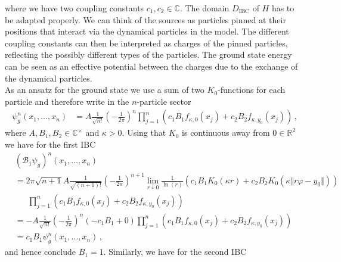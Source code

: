 where we have two coupling constants $c_{1},c_{2} \in \mathbb{C}$. The domain $D_{\textrm{IBC}}$ of $H$ has to be adapted properly. We can think of the sources as particles pinned at their positions that interact via the dynamical particles in the model. The different coupling constants can then be interpreted as charges of the pinned particles, reflecting the possibly different types of the particles. The ground state energy can be seen as an effective potential between the charges due to the exchange of the dynamical particles.
\\
As an ansatz for the ground state we use a sum of two $K_{0}$-functions for each particle and therefore write in the $n$-particle sector
\begin{align*}
  \psi_{g}^{n}
  \left(
    x_{1}
    ,
    \dots
    ,
    x_{n}
  \right)
  &=
  A
  \frac{1}{\sqrt{n!}}
  \left(
    -
    \frac{1}{2\pi}
  \right)^{n}
  \prod_{j = 1}^{n}
  \left(
    c_{1}
    B_{1}
    f_{\kappa,0}(x_{j})
    +
    c_{2}
    B_{2}
    f_{\kappa,y_{0}}(x_{j})
  \right)
  \,,
\end{align*}
where $A,B_{1},B_{2} \in \mathbb{C}^{\times}$ and $\kappa > 0$. Using that $K_{0}$ is continuous away from $0 \in \mathbb{R}^{2}$ we have for the first IBC
\begin{align*}
  &
  (\mathcal{B}_{1}\psi_{g})^{n}
  \left(
    x_{1}
    ,
    \dots
    ,
    x_{n}
  \right)
  \\
  &=
  2\pi
  \sqrt{n + 1}
  A
  \frac{1}{\sqrt{(n + 1)!}}
  \left(
    -
    \frac{1}{2\pi}
  \right)^{n + 1}
  \lim_{r \downarrow 0}
  \frac{1}{\ln(r)}
  \left(
    c_{1}
    B_{1}
    K_{0}(\kappa r)
    +
    c_{2}
    B_{2}
    K_{0}
    \left(
      \kappa
      \Vert r\varphi - y_{0} \Vert
    \right)
  \right)
  \\
  &\phantom{=\ }
  \prod_{j = 1}^{n}
  \left(
    c_{1}
    B_{1}
    f_{\kappa,0}(x_{j})
    +
    c_{2}
    B_{2}
    f_{\kappa,y_{0}}(x_{j})
  \right)
  \\
  &=
  -
  A
  \frac{1}{\sqrt{n!}}
  \left(
    -
    \frac{1}{2\pi}
  \right)^{n}
  \left(
    -
    c_{1}
    B_{1}
    +
    0
  \right)
  \prod_{j = 1}^{n}
  \left(
    c_{1}
    B_{1}
    f_{\kappa,0}(x_{j})
    +
    c_{2}
    B_{2}
    f_{\kappa,y_{0}}(x_{j})
  \right)
  \\
  &=
  c_{1}
  B_{1}
  \psi_{g}^{n}
  \left(
    x_{1}
    ,
    \dots
    ,
    x_{n}
  \right)
  \,,
\end{align*}
and hence conclude $B_{1} = 1$. Similarly, we have for the second IBC
